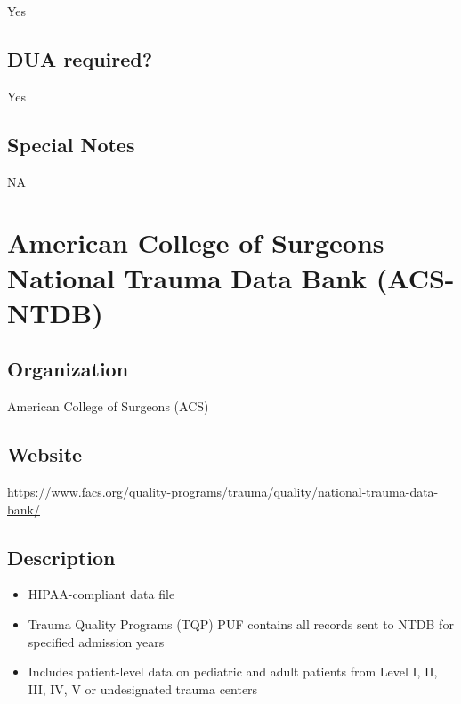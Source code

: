 \documentclass[
]{book}
\providecommand{\tightlist}{%
  \setlength{\itemsep}{0pt}\setlength{\parskip}{0pt}}
\begin{document}
Yes

\hypertarget{dua-required-2}{%
\section{DUA required?}\label{dua-required-2}}

Yes

\hypertarget{special-notes-2}{%
\section{Special Notes}\label{special-notes-2}}

NA

\mainmatter

\hypertarget{american-college-of-surgeons-national-trauma-data-bank-acs-ntdb}{%
\chapter{American College of Surgeons National Trauma Data Bank (ACS-NTDB)}\label{american-college-of-surgeons-national-trauma-data-bank-acs-ntdb}}

\hypertarget{organization-3}{%
\section{Organization}\label{organization-3}}

American College of Surgeons (ACS)

\hypertarget{website-3}{%
\section{Website}\label{website-3}}

\url{https://www.facs.org/quality-programs/trauma/quality/national-trauma-data-bank/}

\hypertarget{description-3}{%
\section{Description}\label{description-3}}

\begin{itemize}
\tightlist
\item
  HIPAA-compliant data file
\item
  Trauma Quality Programs (TQP) PUF contains all records sent to NTDB for specified admission years
\item
  Includes patient-level data on pediatric and adult patients from Level I, II, III, IV, V or undesignated trauma centers
\end{itemize}
\end{document}

